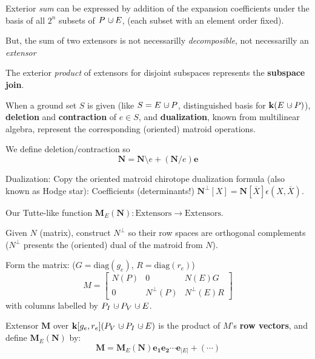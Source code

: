\documentclass[%
  slidesonly,%
  semlayer,%
  amsmath
  ]{seminar}                                  %
\newcommand{\dunion}
{\mbox{\hbox{\hskip6pt$\cdot$\hskip-5.50pt$\cup$\hskip2pt}}}
\begin{document}
\begin{slide}
Exterior \textit{sum} can be expressed by addition of the expansion coefficients
under the basis of all $2^n$ subsets of $P\dunion E$, (each subset with an element order fixed).

But, the sum of two extensors is not necessarilly \textit{decomposible}, not necessarilly
an \textit{extensor}

The exterior \textit{product} of extensors for disjoint subspaces represents the
\textbf{subspace join}.

When a ground set $S$ is given (like $S=E\dunion P$, distinguished basis for 
$\mathbf{k}(E\dunion P)$), \textbf{deletion} and  \textbf{contraction} of $e\in S$, 
and \textbf{dualization}, known from multilinear algebra, represent
the corresponding (oriented) matroid operations.

We define deletion/contraction so 
\[
\mathbf{N} = \mathbf{N}\setminus e + (\mathbf{N}/e)\mathbf{e}
\]

Dualization: Copy the oriented matroid chirotope dualization formula
(also known as Hodge star): Coefficients (determinants!)
$\mathbf{N}^{\perp}[X]=\mathbf{N}[\overline{X}]\epsilon(X,\overline{X})$.

\end{slide}
\begin{slide}

Our Tutte-like function $\mathbf{M}_E(\mathbf{N}):\text{Extensors}\rightarrow\text{Extensors}$.

Given $N$ (matrix), construct $N^\perp$ so their row spaces are orthogonal
complements ($N^\perp$ presents the (oriented) dual of the matroid from $N$).

Form the matrix:  ($G=\mbox{diag}(g_e)$, $R=\mbox{diag}(r_e)$)
\[
M = \left[\begin{array}{c|c|c} N(P)  &  0  &  N(E)G \\  \hline
0  & N^{\perp}(P)  &  N^{\perp}(E)R \end{array}\right]
\]
with columns labelled by $P_I\dunion P_V\dunion E$.

Extensor $\mathbf{M}$ over $\mathbf{k}[g_e, r_e](P_V\dunion P_I \dunion E)$
is the product of $M$'s \textbf{row vectors}, and define $\mathbf{M}_E(\mathbf{N})$ by:
\[
\mathbf{M} = \mathbf{M}_E(\mathbf{N})\mathbf{e_1}\mathbf{e_2}\cdots\mathbf{e}_{|E|} + (\cdots) 
\]


\end{slide}
\end{document}

